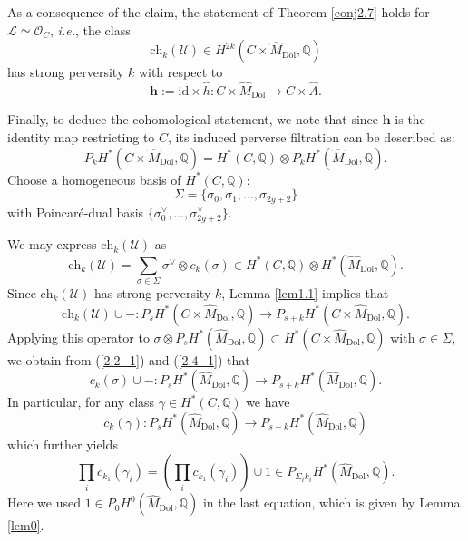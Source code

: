 \documentclass[11pt]{amsart}
\theoremstyle{plain}
\theoremstyle{definition}
\theoremstyle{remark}
\newcommand{\BQ}{{\mathbb{Q}}}
\newcommand{\CL}{{\mathcal L}}
\newcommand{\CO}{{\mathcal O}}
\newcommand{\CU}{{\mathcal U}}
\begin{document}




As a consequence of the claim, the statement of Theorem \ref{conj2.7} holds for $\CL \simeq \CO_C$, \emph{i.e.}, the class 
\[
\mathrm{ch}_k(\CU) \in H^{2k}(C\times \widehat{M}_{\mathrm{Dol}}, \BQ)
\] 
has strong perversity $k$ with respect to 
\[
\mathbf{h}:= \mathrm{id} \times \widehat{h}: C\times \widehat{M}_{\mathrm{Dol}} \to C\times \widehat{A}.
\]



Finally, to deduce the cohomological statement, we note that since $\mathbf{h}$ is the identity map restricting to $C$, its induced perverse filtration can be described as:
\begin{equation}\label{2.2_1}
P_kH^*(C \times \widehat{M}_{\mathrm{Dol}}, \BQ) = H^*(C, \BQ) \otimes P_kH^*(\widehat{M}_{\mathrm{Dol}}, \BQ).
\end{equation}
Choose a homogeneous basis of $H^*(C, \BQ)$:
\[
\Sigma=\{\sigma_0, \sigma_1, \dots, \sigma_{2g+2}\}
\]
with Poincar\'e-dual basis $\{\sigma^{\vee}_{0}, \dots, \sigma^\vee_{2g+2}\}$.

We may express $\mathrm{ch}_k(\CU)$ as
\begin{equation}\label{2.4_1}
\mathrm{ch}_k(\CU) = \sum_{\sigma\in \Sigma} \sigma^\vee \otimes c_k(\sigma) \in H^*(C, \BQ) \otimes H^*(\widehat{M}_{\mathrm{Dol}}, \BQ).
\end{equation}
Since $\mathrm{ch}_k(\CU)$ has strong perversity $k$, Lemma \ref{lem1.1} implies that
\[
\mathrm{ch}_k(\CU) \cup - : P_sH^*(C\times \widehat{M}_{\mathrm{Dol}}, \BQ) \to P_{s+k}H^{*}(C\times \widehat{M}_{\mathrm{Dol}}, \BQ).
\]
Applying this operator to $\sigma \otimes P_sH^*(\widehat{M}_{\mathrm{Dol}}, \BQ) \subset H^*(C\times \widehat{M}_{\mathrm{Dol}}, \BQ)$ with $\sigma \in \Sigma$, we obtain from (\ref{2.2_1}) and (\ref{2.4_1}) that
\[
c_k(\sigma) \cup -: P_sH^*(\widehat{M}_{\mathrm{Dol}}, \BQ) \to P_{s+k}H^*(\widehat{M}_{\mathrm{Dol}}, \BQ). 
\]
In particular, for any class $\gamma \in H^*(C, \BQ)$ we have
\[
c_k(\gamma): P_sH^*(\widehat{M}_{\mathrm{Dol}}, \BQ) \to P_{s+k}H^*(\widehat{M}_{\mathrm{Dol}}, \BQ)\]
which further yields
\[
\prod_ic_{k_1}(\gamma_i) = \left( \prod_ic_{k_1}(\gamma_i) \right) \cup 1 \in P_{\Sigma_ik_i}H^*(\widehat{M}_{\mathrm{Dol}}, \BQ).
 \]
 Here we used $1\in P_0H^0(\widehat{M}_{\mathrm{Dol}}, \BQ)$ in the last equation, which is given by Lemma \ref{lem0}.
\end{document}
